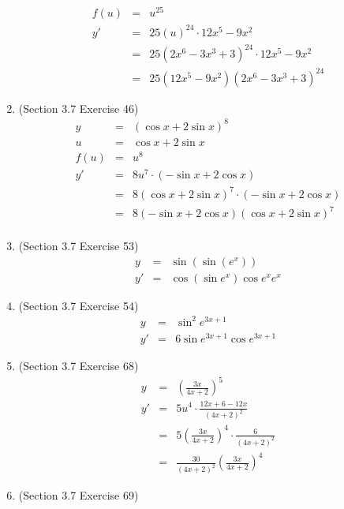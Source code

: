 \documentclass{article}
\begin{document}
\begin{enumerate}
\begin{eqnarray}
            f(u) &=& u^{25} \\
            y' &=& 25\left(u\right)^{24} \cdot 12x^5 - 9x^2 \\
               &=& 25\left(2x^6 - 3x^3 + 3\right)^{24} \cdot 12x^5 - 9x^2 \\
               &=& 25\left(12x^5 - 9x^2\right)\left(2x^6 - 3x^3 + 3\right)^{24}
        \end{eqnarray}
    \item (Section 3.7 Exercise 46)
        \begin{eqnarray}
            y &=& (\cos{x} + 2\sin{x})^8 \\
            u &=& \cos{x} + 2\sin{x} \\
            f(u) &=& u^8 \\
            y' &=& 8u^7 \cdot (-\sin{x} + 2\cos{x}) \\
               &=& 8\left(\cos{x} + 2\sin{x}\right)^7 \cdot (-\sin{x} + 2\cos{x}) \\
               &=& 8(-\sin{x} + 2\cos{x})\left(\cos{x} + 2\sin{x}\right)^7 \\
        \end{eqnarray}
    \item (Section 3.7 Exercise 53)
        \begin{eqnarray}
            y &=& \sin{(\sin{(e^x)})} \\
            y' &=& \cos{(\sin{e^x})}\cos{e^x}e^x
        \end{eqnarray}
    \item (Section 3.7 Exercise 54)
        \begin{eqnarray}
            y &=& \sin^2{e^{3x + 1}} \\
            y' &=& 6\sin{e^{3x+1}}\cos{e^{3x+1}}
        \end{eqnarray}
    \item (Section 3.7 Exercise 68)
        \begin{eqnarray}
            y &=& \left(\frac{3x}{4x+2}\right)^5 \\
            y' &=& 5u^4 \cdot \frac{12x+6 - 12x}{\left(4x+2\right)^2} \\
               &=& 5\left(\frac{3x}{4x+2}\right)^4 \cdot \frac{6}{\left(4x+2\right)^2} \\
               &=& \frac{30}{\left(4x+2\right)^2}\left(\frac{3x}{4x+2}\right)^4
        \end{eqnarray}
    \item (Section 3.7 Exercise 69)
        \begin{eqnarray}

\end{eqnarray}
\end{enumerate}
\end{document}
